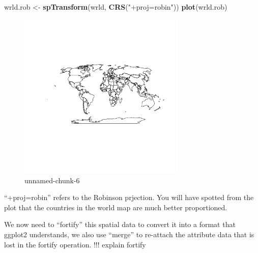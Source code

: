 \documentclass[]{article}
\newenvironment{Shaded}{}{}
\newcommand{\KeywordTok}[1]{\textcolor[rgb]{0.00,0.44,0.13}{\textbf{{#1}}}}
\newcommand{\StringTok}[1]{\textcolor[rgb]{0.25,0.44,0.63}{{#1}}}
\newcommand{\NormalTok}[1]{{#1}}
\let\Oldincludegraphics\includegraphics
\renewcommand{\includegraphics}[1]{\Oldincludegraphics[width=8cm]{#1}}
\begin{document}
\begin{Shaded}
\begin{Highlighting}[]
\NormalTok{wrld.rob <- }\KeywordTok{spTransform}\NormalTok{(wrld, }\KeywordTok{CRS}\NormalTok{(}\StringTok{"+proj=robin"}\NormalTok{))}
\KeywordTok{plot}\NormalTok{(wrld.rob)}
\end{Highlighting}
\end{Shaded}
\begin{figure}[htbp]
\centering
\includegraphics{figure/unnamed-chunk-6.png}
\caption{unnamed-chunk-6}
\end{figure}

``+proj=robin'' refers to the Robinson prjection. You will have spotted
from the plot that the countries in the world map are much better
proportioned.

We now need to ``fortify'' this spatial data to convert it into a format
that ggplot2 understands, we also use ``merge'' to re-attach the
attribute data that is lost in the fortify operation. !!! explain
fortify
\end{document}
